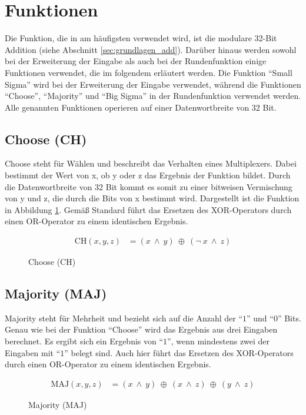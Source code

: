 \section{Funktionen}
\label{sec:sha256:funktionen}

Die Funktion, die in  am häufigsten verwendet wird, ist die modulare 32-Bit Addition (siehe Abschnitt \ref{sec:grundlagen_add}).
Darüber hinaus werden sowohl bei der Erweiterung der Eingabe als auch bei der Rundenfunktion einige Funktionen verwendet, die im folgendem erläutert werden.
Die Funktion "`Small Sigma"' wird bei der Erweiterung der Eingabe verwendet, während die Funktionen "`Choose"', "`Majority"' und "`Big Sigma"' in der Rundenfunktion
verwendet werden. Alle genannten Funktionen operieren auf einer Datenwortbreite von 32 Bit.


\subsection{Choose (CH)}
Choose steht für Wählen und beschreibt das Verhalten eines Multiplexers. Dabei bestimmt der Wert von x, ob y oder z das Ergebnis der Funktion bildet.
Durch die Datenwortbreite von 32 Bit kommt es somit zu einer bitweisen Vermischung von y und z, die durch die Bits von x bestimmt wird. Dargestellt
ist die Funktion in Abbildung \ref{eq:ch}. Gemäß Standard \cite[10]{nist1804} führt das Ersetzen des XOR-Operators durch einen OR-Operator zu einem identischen Ergebnis.
\begin{figure}[!h]
  \begin{align}
  \text{CH}( x, y, z) &= (x~\wedge~y)~\oplus~( \neg~x~\wedge~z) \nonumber
  \end{align}
  \caption{Choose (CH)}
  \label{eq:ch}
\end{figure}

\subsection{Majority (MAJ)}
Majority steht für Mehrheit und bezieht sich auf die Anzahl der "`$1$"' und "`$0$"' Bits. Genau wie bei der Funktion "`Choose"' wird das Ergebnis aus drei Eingaben berechnet.
Es ergibt sich ein Ergebnis von "`$1$"', wenn mindestens zwei der Eingaben mit "`$1$"' belegt sind. Auch hier führt das Ersetzen des XOR-Operators durch einen OR-Operator zu
einem identischen Ergebnis.
\begin{figure}[!h]
  \begin{align}
  \text{MAJ}( x, y, z) &= (x~\wedge~y)~\oplus~(x~\wedge~z)~\oplus~(y~\wedge~z) \nonumber
  \end{align}
  \caption{Majority (MAJ)}
  \label{eq:maj}
\end{figure}

